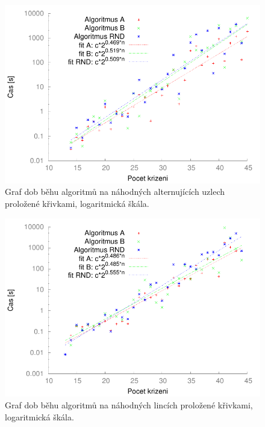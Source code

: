 \begin{figure}[p]\centering
\includegraphics{../img/alt_knotsFIT}
\caption{Graf dob běhu algoritmů na náhodných alternujících uzlech proložené křivkami, logaritmická škála.}
\label{obr03:altSrov}
\end{figure}

\begin{figure}[p]\centering
\includegraphics{../img/linksFIT}
\caption{Graf dob běhu algoritmů na náhodných lincích proložené křivkami, logaritmická škála.}
\label{obr03:linkSrov}
\end{figure}



